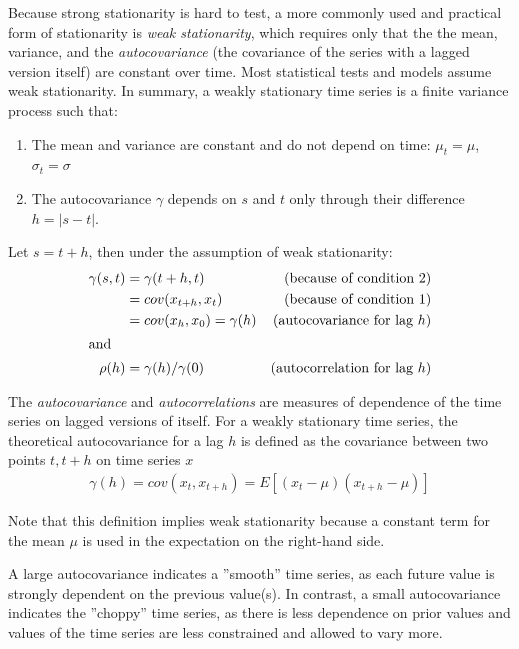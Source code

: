 Because strong stationarity is hard to test, a more commonly used and practical form of stationarity is \emph{weak stationarity}, which requires only that the the mean, variance, and the \emph{autocovariance} (the covariance of the series with a lagged version itself) are constant over time. Most statistical tests and models assume weak stationarity. In summary, a weakly stationary time series is a finite variance process such that:

\begin{enumerate}
\item The mean and variance are constant and do not depend on time: $\mu_t = \mu$, $\sigma_t = \sigma$
\item The autocovariance $\gamma$ depends on $s$ and $t$ only through their difference $h=|s-t|$.
\end{enumerate}

Let $s = t + h$, then under the assumption of weak stationarity:
\begin{align*}
\gamma(s, t) &= \gamma(t+h, t)  &\text{(because of condition 2)} \\ 
             &= cov(x_{t+h}, x_t)  &\text{(because of condition 1)} \\ 
             &= cov(x_h, x_0) = \gamma(h)  &\text{(autocovariance for lag $h$)} \\
\intertext{and}
\rho(h) &= \gamma(h) / \gamma(0) &\text{(autocorrelation for lag $h$)}
\end{align*}

The \emph{autocovariance} and \emph{autocorrelations} are measures of dependence of the time series on lagged versions of itself. For a weakly stationary time series, the theoretical autocovariance for a lag $h$ is defined as the covariance between two points $t, t+h$ on time series $x$
\begin{align*}
\gamma(h) = cov(x_t, x_{t+h}) = E [ (x_t - \mu)(x_{t+h} - \mu)] 
\end{align*}

Note that this definition implies weak stationarity because a constant term for the mean $\mu$ is used in the expectation on the right-hand side.

A large autocovariance indicates a ''smooth'' time series, as each future value is strongly dependent on the previous value(s). In contrast, a small autocovariance indicates the ''choppy'' time series, as there is less dependence on prior values and values of the time series are less constrained and allowed to vary more. 

